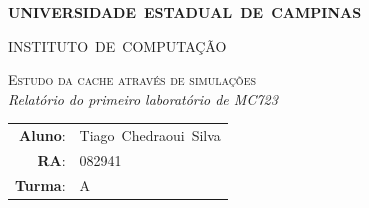 \documentclass[12pt,a4paper]{article}
\begin{document}
\begin{titlepage}
\thispagestyle{empty}
  \begin{center} {\large \textbf{UNIVERSIDADE~ESTADUAL~DE~CAMPINAS}} \end{center}
  \begin{center} {\large INSTITUTO~DE~COMPUTAÇÃO}                    \end{center}
  \vspace{0.1cm}
  \begin{center}
  \begin{minipage}[tl]{31mm}
  \end{minipage}
  \end{center}
  \vspace{0.3cm}
  \begin{center} 
    {\large \textsc{Estudo da cache através de simulações
               }} 
    \\\vspace{0.5cm}
    {\textsl{Relatório do primeiro laboratório de MC723}}
    \\\vspace{1cm}
    \begin{tabular}{rl}
	  \textbf{Aluno}:       & Tiago~Chedraoui~Silva \\
	  \textbf{RA}:       & 082941 \\
	  \textbf{Turma}:       & A \\

	\end{tabular}
  \end{center}
  \vspace{0.5cm}

  \begin{abstract}
O princípio de funcionamento da memória cache é duplicar parte dos dados contidos na memória
principal, que é mais lenta, em um módulo menor composto por
dispositivos de memória mais rápidos chamado de memória cache.
Quando o processador solicita um item de dado, o gerenciador de
memória requisita este item da memória cache. Se o item de dado estiver presente na
cache é dito que ocorreu um hit e ele é retornado para o processador praticamente sem período de
latência, porém caso o item de dado não esteja presente na memória cache, é
dito que ocorreu um miss, logo o processador deve aguardar o dado ser buscado da memória principal.
Nesse laboratório, estudaremos a melhor organização de uma memória
cache para a execução de um determinado programa.

  \end{abstract}

  \tableofcontents
\end{titlepage} 
\end{document}
